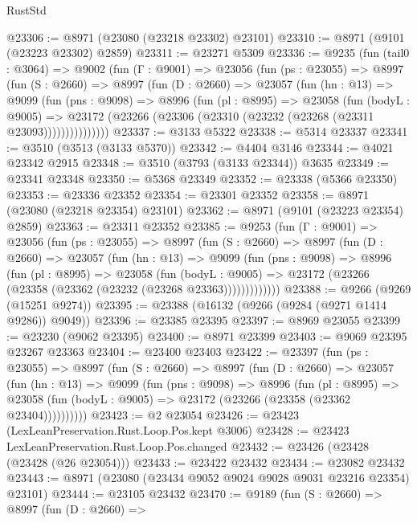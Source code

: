\begin{lexlean}{RustStd}
\begin{coremodule}
@23306 := @8971 (@23080 (@23218 @23302) @23101)
@23310 := @8971 (@9101 (@23223 @23302) @2859)
@23311 := @23271 @5309
@23336 := @9235
    (fun (tail0 : @3064) =>
    @9002
      (fun (Γ : @9001) =>
      @23056
        (fun (ps : @23055) =>
        @8997
          (fun (S : @2660) =>
          @8997
            (fun (D : @2660) =>
            @23057
              (fun (hn : @13) =>
              @9099
                (fun (pns : @9098) =>
                @8996
                  (fun (pl : @8995) =>
                  @23058
                    (fun (bodyL : @9005) =>
                    @23172 (@23266 (@23306 (@23310 (@23232 (@23268 (@23311 @23093)))))))))))))))
@23337 := @3133 @5322
@23338 := @5314 @23337
@23341 := @3510 (@3513 (@3133 @5370))
@23342 := @4404 @3146
@23344 := @4021 @23342 @2915
@23348 := @3510 (@3793 (@3133 @23344)) @3635
@23349 := @23341 @23348
@23350 := @5368 @23349
@23352 := @23338 (@5366 @23350)
@23353 := @23336 @23352
@23354 := @23301 @23352
@23358 := @8971 (@23080 (@23218 @23354) @23101)
@23362 := @8971 (@9101 (@23223 @23354) @2859)
@23363 := @23311 @23352
@23385 := @9253
    (fun (Γ : @9001) =>
    @23056
      (fun (ps : @23055) =>
      @8997
        (fun (S : @2660) =>
        @8997
          (fun (D : @2660) =>
          @23057
            (fun (hn : @13) =>
            @9099
              (fun (pns : @9098) =>
              @8996
                (fun (pl : @8995) =>
                @23058
                  (fun (bodyL : @9005) =>
                  @23172 (@23266 (@23358 (@23362 (@23232 (@23268 @23363)))))))))))))
@23388 := @9266 (@9269 (@15251 @9274))
@23395 := @23388 (@16132 (@9266 (@9284 (@9271 @1414 @9286)) @9049))
@23396 := @23385 @23395
@23397 := @8969 @23055
@23399 := @23230 (@9062 @23395)
@23400 := @8971 @23399
@23403 := @9069 @23395 @23267 @23363
@23404 := @23400 @23403
@23422 := @23397
    (fun (ps : @23055) =>
    @8997
      (fun (S : @2660) =>
      @8997
        (fun (D : @2660) =>
        @23057
          (fun (hn : @13) =>
          @9099
            (fun (pns : @9098) =>
            @8996
              (fun (pl : @8995) =>
              @23058 (fun (bodyL : @9005) => @23172 (@23266 (@23358 (@23362 @23404))))))))))
@23423 := @2 @23054
@23426 := @23423 (LexLeanPreservation.Rust.Loop.Pos.kept @3006)
@23428 := @23423 LexLeanPreservation.Rust.Loop.Pos.changed
@23432 := @23426 (@23428 (@23428 (@26 @23054)))
@23433 := @23422 @23432
@23434 := @23082 @23432
@23443 := @8971 (@23080 (@23434 @9052 @9024 @9028 @9031 @23216 @23354) @23101)
@23444 := @23105 @23432
@23470 := @9189
    (fun (S : @2660) =>
    @8997
      (fun (D : @2660) =>

\end{coremodule}
\end{lexlean}
